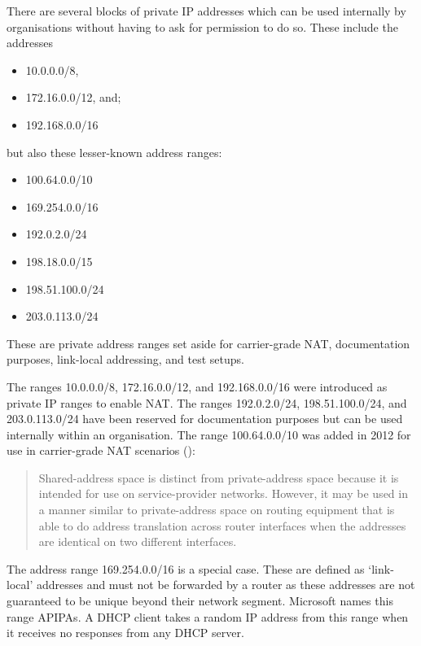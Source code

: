 There are several blocks of private \acs{IP} addresses which can be used internally by organisations without having to ask for permission to do so.
These include the  addresses
\begin{multicols}{3}
\raggedcolumns
\begin{itemize}
\item 10.0.0.0/8,
\item 172.16.0.0/12, and;
\item 192.168.0.0/16
\end{itemize}
\end{multicols}
but also these lesser-known address ranges:
\begin{multicols}{3}
\raggedcolumns
\begin{itemize}
\item 100.64.0.0/10
\item 169.254.0.0/16
\item 192.0.2.0/24
\item 198.18.0.0/15
\item 198.51.100.0/24
\item 203.0.113.0/24
\end{itemize}
\end{multicols}
These are private address ranges set aside for carrier-grade \acs{NAT}, documentation purposes, link-local addressing, and test setups.

The ranges 10.0.0.0/8, 172.16.0.0/12, and 192.168.0.0/16 were introduced as private IP ranges to enable \acf{NAT}.
The ranges 192.0.2.0/24, 198.51.100.0/24, and 203.0.113.0/24 have been reserved for documentation purposes but can be used internally within an organisation.
The range 100.64.0.0/10 was added in 2012 for use in carrier-grade \ac{NAT} scenarios ():

\begin{quote}
Shared-address space is distinct from  private-address space because it is intended for use on service-provider networks.
However, it may be used in a manner similar to  private-address space on routing equipment that is able to do address translation across router interfaces when the addresses are identical on two different interfaces.
\end{quote}

The address range 169.254.0.0/16 is a special case.
These are defined as `link-local' addresses and must not be forwarded by a router as these addresses are not guaranteed to be unique beyond their network segment.%
Microsoft names this range \acp{APIPA}.%
A \acs{DHCP} client takes a random \acs{IP} address from this range when it receives no responses from any \acs{DHCP} server.

